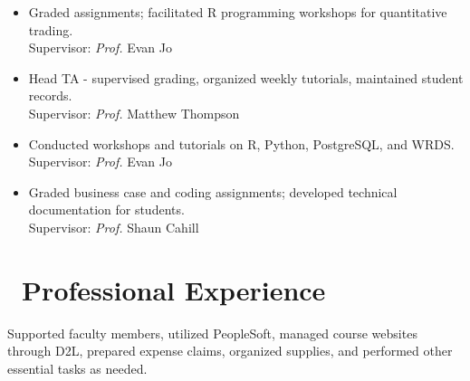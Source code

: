\documentclass{resume}
\begin{document}
\begin{itemize}
  \item {}
  {Graded assignments; facilitated R programming workshops for quantitative trading. }\\
  {Supervisor: \emph{Prof.} Evan Jo}\\
  \vspace{-0.5em}
  
  \item {}
  {Head TA - supervised grading, organized weekly tutorials, maintained student records.}\\
  {Supervisor: \emph{Prof.} Matthew Thompson}\\
  \vspace{-0.5em}
  
  \item {}
  {Conducted workshops and tutorials on R, Python, PostgreSQL, and WRDS.}\\
  {Supervisor: \emph{Prof.} Evan Jo}\\
  \vspace{-0.5em}
  
  \item {}
  {Graded business case and coding assignments; developed technical documentation for students.}\\
  {Supervisor: \emph{Prof.} Shaun Cahill}\\
  \vspace{-0.5em}
  
\end{itemize}


\section{\faBriefcase\ Professional Experience}

 {}
Supported faculty members, utilized PeopleSoft, managed course websites through D2L, prepared expense claims, organized supplies, and performed other essential tasks as needed. 
\end{document}
